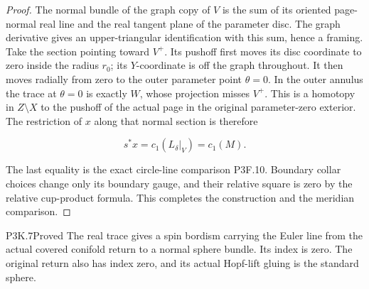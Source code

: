 \begin{proof}
The normal bundle of the graph copy of \(V\) is the sum of its
oriented page-normal real line and the real tangent plane of the
parameter disc.  The graph derivative gives an upper-triangular
identification with this sum, hence a framing.  Take the section
pointing toward \(V^+\).  Its pushoff first moves its disc coordinate
to zero inside the radius \(r_0\); its \(Y\)-coordinate is off the
graph throughout.  It then moves radially from zero to the outer
parameter point \(\theta=0\).  In the outer annulus the trace at
\(\theta=0\) is exactly \(W\), whose projection misses \(V^+\).
This is a homotopy in \(Z\setminus X\) to the pushoff of the actual
page in the original parameter-zero exterior.  The restriction of
\(x\) along that normal section is therefore

\[
 s^*x=c_1(L_\delta|_V)=c_1(M).
\]

The last equality is the exact circle-line comparison P3F.10.
Boundary collar choices change only its boundary gauge, and their
relative square is zero by the relative cup-product formula.
This completes the construction and the meridian comparison.
\end{proof}

\begin{statement}{P3K.7}{Proved}
The real trace gives a spin bordism carrying the Euler line from the actual covered conifold return to a normal sphere bundle.  Its index is zero.  The original return also has index zero, and its actual Hopf-lift gluing is the standard sphere.
\end{statement}

